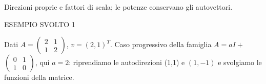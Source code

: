 
Direzioni proprie e fattori di scala; le potenze conservano gli autovettori.\par


\Needspace{.36\textheight}\label{c2-funzioni-matrice-example-1}
{\sffamily\small\color{Accent} ESEMPIO SVOLTO 1\par}
Dati \(A=\)\(\begin{pmatrix}2&1\\1&2\end{pmatrix}\), \(v=(2{,}1)^{T}\). Caso progressivo della famiglia \(A=aI+\)\(\begin{pmatrix}0&1\\1&0\end{pmatrix}\), qui \(a=2\): riprendiamo le autodirezioni (1,1) e \((1,\allowbreak - 1)\) e svolgiamo le funzioni della matrice.\par


